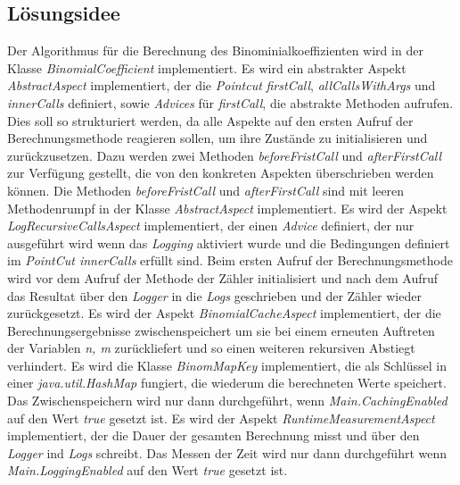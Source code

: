 \documentclass[11pt, a4paper, twoside]{article}   	%
\begin{document}
\subsection{Lösungsidee} 
Der Algorithmus für die Berechnung des Binominialkoeffizienten wird in der Klasse \emph{BinomialCoefficient} implementiert.
\newline
\newline
Es wird ein abstrakter Aspekt \emph{AbstractAspect} implementiert, der die \emph{Pointcut} \emph{firstCall}, \emph{allCallsWithArgs} und \emph{innerCalls} definiert, sowie \emph{Advices} für \emph{firstCall}, die abstrakte Methoden aufrufen. Dies soll so strukturiert werden, da alle Aspekte auf den ersten Aufruf der Berechnungsmethode reagieren sollen, um ihre Zustände zu initialisieren und zurückzusetzen. Dazu werden zwei Methoden \emph{beforeFristCall} und \emph{afterFirstCall} zur Verfügung gestellt, die von den konkreten Aspekten überschrieben werden können. Die Methoden \emph{beforeFristCall} und \emph{afterFirstCall} sind mit leeren Methodenrumpf in der Klasse \emph{AbstractAspect} implementiert. 
\newline
\newline
Es wird der Aspekt \emph{LogRecursiveCallsAspect} implementiert, der einen \emph{Advice} definiert, der nur ausgeführt wird wenn das \emph{Logging} aktiviert wurde und die Bedingungen definiert im \emph{PointCut innerCalls} erfüllt sind. Beim ersten Aufruf der Berechnungsmethode wird vor dem Aufruf der Methode der Zähler initialisiert und nach dem Aufruf das Resultat über den \emph{Logger} in die \emph{Logs} geschrieben und der Zähler wieder zurückgesetzt.
\newline
\newline
Es wird der Aspekt \emph{BinomialCacheAspect} implementiert, der die Berechnungsergebnisse zwischenspeichert um sie bei einem erneuten Auftreten der Variablen \emph{n, m} zurückliefert und so einen weiteren rekursiven Abstiegt verhindert. Es wird die Klasse \emph{BinomMapKey} implementiert, die als Schlüssel in einer \emph{java.util.HashMap} fungiert, die wiederum die berechneten Werte speichert. Das Zwischenspeichern wird nur dann durchgeführt, wenn \emph{Main.CachingEnabled} auf den Wert \emph{true} gesetzt ist.
\newline
\newline
Es wird der Aspekt \emph{RuntimeMeasurementAspect} implementiert, der die Dauer der gesamten Berechnung misst und über den \emph{Logger} ind \emph{Logs} schreibt. Das Messen der Zeit wird nur dann durchgeführt wenn \emph{Main.LoggingEnabled} auf den Wert \emph{true} gesetzt ist.
\end{document}
